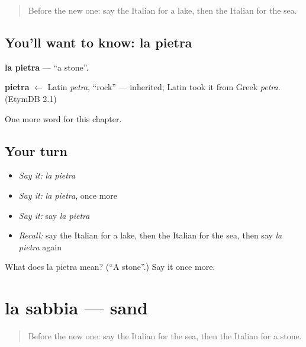 \label{lesson:IT-C65-pietra}



\begin{quote}
Before the new one: say the Italian for a lake, then the Italian for the sea.
\end{quote}

\subsection*{You'll want to know: la pietra}
\textbf{la pietra} — \textquotedblleft{}a stone\textquotedblright{}.

\begin{cousinweb}
\textbf{pietra} $\leftarrow$ Latin \emph{petra}, \textquotedblleft{}rock\textquotedblright{} — inherited; Latin took it from Greek \emph{petra}. (EtymDB 2.1)
\end{cousinweb}

\begin{grammarlens}[title={What you've built}]
One more word for this chapter.
\end{grammarlens}

\subsection*{Your turn}
\begin{itemize}
\raggedright
  \item \emph{Say it:} \emph{la pietra}
  \item \emph{Say it:} \emph{la pietra}, once more
  \item \emph{Say it:} say \emph{la pietra}
  \item \emph{Recall:} say the Italian for a lake, then the Italian for the sea, then say \emph{la pietra} again
\end{itemize}

\begin{tcolorbox}[breakable,colback=teal!4,colframe=teal!35!black,title={Before you move on}]
What does la pietra mean? (\textquotedblleft{}A stone\textquotedblright{}.) Say it once more.
\end{tcolorbox}
\section[la sabbia]{la sabbia — sand}

\label{lesson:IT-C65-sabbia}



\begin{quote}
Before the new one: say the Italian for the sea, then the Italian for a stone.
\end{quote}

